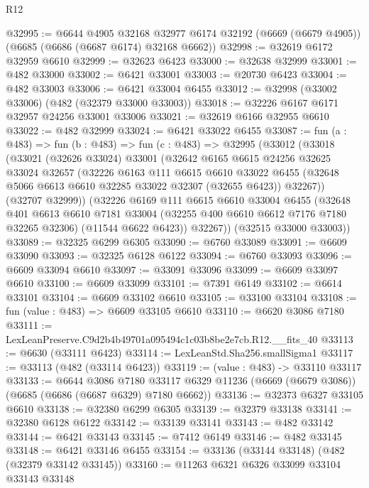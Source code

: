 \begin{lexlean}{R12}
\begin{coremodule}
@32995 := @6644
    @4905
    @32168
    @32977
    @6174
    @32192
    (@6669 (@6679 @4905))
    (@6685 (@6686 (@6687 @6174) @32168 @6662))
@32998 := @32619 @6172 @32959 @6610
@32999 := @32623 @6423
@33000 := @32638 @32999
@33001 := @482 @33000
@33002 := @6421 @33001
@33003 := @20730 @6423
@33004 := @482 @33003
@33006 := @6421 @33004 @6455
@33012 := @32998 (@33002 @33006) (@482 (@32379 @33000 @33003))
@33018 := @32226 @6167 @6171 @32957 @24256 @33001 @33006
@33021 := @32619 @6166 @32955 @6610
@33022 := @482 @32999
@33024 := @6421 @33022 @6455
@33087 := fun (a : @483) =>
  fun (b : @483) =>
  fun (c : @483) =>
  @32995
    (@33012
      (@33018
        (@33021
          (@32626 @33024)
          @33001
          (@32642
            @6165
            @6615
            @24256
            @32625
            @33024
            @32657
            (@32226
              @6163
              @111
              @6615
              @6610
              @33022
              @6455
              (@32648 @5066 @6613 @6610 @32285 @33022 @32307 (@32655 @6423))
              @32267))
          (@32707 @32999))
        (@32226
          @6169
          @111
          @6615
          @6610
          @33004
          @6455
          (@32648
            @401
            @6613
            @6610
            @7181
            @33004
            (@32255 @400 @6610 @6612 @7176 @7180 @32265 @32306)
            (@11544 @6622 @6423))
          @32267))
      (@32515 @33000 @33003))
@33089 := @32325 @6299 @6305
@33090 := @6760 @33089
@33091 := @6609 @33090
@33093 := @32325 @6128 @6122
@33094 := @6760 @33093
@33096 := @6609 @33094 @6610
@33097 := @33091 @33096
@33099 := @6609 @33097 @6610
@33100 := @6609 @33099
@33101 := @7391 @6149
@33102 := @6614 @33101
@33104 := @6609 @33102 @6610
@33105 := @33100 @33104
@33108 := fun (value : @483) => @6609 @33105 @6610
@33110 := @6620 @3086 @7180
@33111 := LexLeanPreserve.C9d2b4b49701a095494c1c03b8be2e7cb.R12.__fits_40
@33113 := @6630 (@33111 @6423)
@33114 := LexLeanStd.Sha256.smallSigma1
@33117 := @33113 (@482 (@33114 @6423))
@33119 := (value : @483) -> @33110 @33117
@33133 := @6644
    @3086
    @7180
    @33117
    @6329
    @11236
    (@6669 (@6679 @3086))
    (@6685 (@6686 (@6687 @6329) @7180 @6662))
@33136 := @32373 @6327 @33105 @6610
@33138 := @32380 @6299 @6305
@33139 := @32379 @33138
@33141 := @32380 @6128 @6122
@33142 := @33139 @33141
@33143 := @482 @33142
@33144 := @6421 @33143
@33145 := @7412 @6149
@33146 := @482 @33145
@33148 := @6421 @33146 @6455
@33154 := @33136 (@33144 @33148) (@482 (@32379 @33142 @33145))
@33160 := @11263 @6321 @6326 @33099 @33104 @33143 @33148

\end{coremodule}
\end{lexlean}
